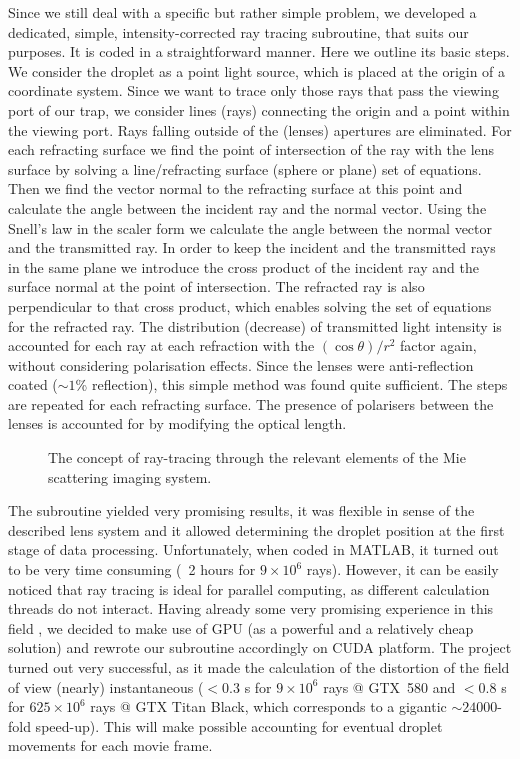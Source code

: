 \documentclass[12pt,dvips]{elsarticle}
\begin{document}
Since we still deal with a specific but rather simple problem, we developed a dedicated, simple, intensity-corrected ray
tracing subroutine, that suits our purposes. It is coded in a straightforward manner. Here we outline its basic steps. We
consider the droplet as a point light source, which is placed at the origin of a coordinate system. Since we want to trace
only those rays that pass the viewing port of our trap, we consider lines (rays) connecting the origin and a point within
the viewing port. Rays falling outside of the (lenses) apertures are eliminated. For each refracting surface we find the
point of intersection of the ray with the lens surface by solving a line/refracting surface (sphere or plane) set of
equations. Then we find the vector normal to the refracting surface at this point and calculate the angle between the
incident ray and the normal vector. Using the Snell's law in the scaler form we calculate the angle between the normal
vector and the transmitted ray. In order to keep the incident and the transmitted rays in the same plane we introduce the
cross product of the incident ray and the surface normal at the point of intersection. The refracted ray is also
perpendicular to that cross product, which enables solving the set of equations for the refracted ray. The distribution
(decrease) of transmitted light intensity is accounted for each ray at each refraction with the $(\cos \theta) /r^2$
factor again, without considering polarisation effects. Since the lenses were anti-reflection coated ($\sim 1$\%
reflection), this simple method was found quite sufficient. The steps are repeated for each refracting surface. The
presence of polarisers between the lenses is accounted for by modifying the optical length.
\begin{figure}[h!t!b!]
\begin{center}
\end{center}
\caption{The concept of ray-tracing through the relevant elements of the Mie scattering imaging
system.}\label{ray-tracing}
\end{figure}

The subroutine yielded very promising results, it was flexible in sense of the described lens system and it allowed
determining the droplet position at the first stage of data processing. Unfortunately, when coded in MATLAB, it turned out
to be very time consuming (~2 hours for $9\times 10^6$  rays). However, it can be easily noticed that ray tracing is ideal
for parallel computing, as different calculation threads do not interact. Having already some very promising experience in
this field \cite{Smigacz}, we decided to make use of GPU (as a powerful and a relatively cheap solution) and rewrote our
subroutine accordingly on CUDA platform. The project turned out very successful, as it made the calculation of the
distortion of the field of view (nearly) instantaneous ($<0.3$ s for $9\times 10^6$ rays @ GTX~580 and $<0.8$ s for
$625\times 10^6$ rays @ GTX Titan Black, which corresponds to a gigantic $\sim 24000$-fold speed-up). This will make
possible accounting for eventual droplet movements for each movie frame.
\end{document}
